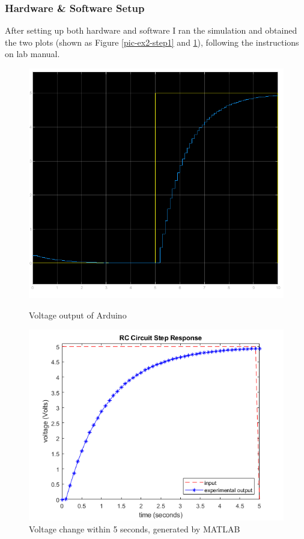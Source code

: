 \subsubsection*{Hardware \& Software Setup}
After setting up both hardware and software I ran the simulation and obtained
the two plots (shown as Figure \ref{pic-ex2-step1} and \ref{pic-ex2-step2}),
following the instructions on lab manual.
\begin{figure}[h!]
  \begin{minipage}{0.49\linewidth} 
    \centering
    \includegraphics[width=\linewidth]{pics/arduino-voltage.png}
    \caption{Voltage output of Arduino}
    \label{pic-ex2-step1}
  \end{minipage}
  \begin{minipage}{0.49\linewidth}
    \centering
    \includegraphics[width=0.9\linewidth]{pics/arduino-plotfigure.png}
    \caption{Voltage change within 5 seconds, generated by MATLAB}
    \label{pic-ex2-step2}
  \end{minipage}
\end{figure}

